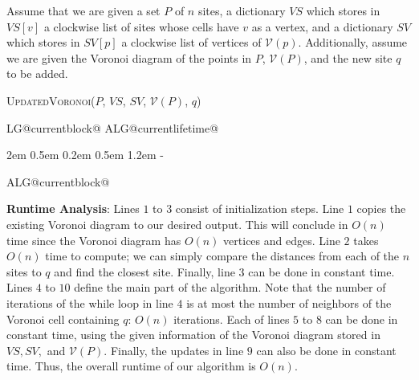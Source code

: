 \documentclass[11pt]{article}
\makeatletter
\newlength{\continueindent}
\renewenvironment{algorithmic}[1][0]%
   {%
   \edef\ALG@numberfreq{#1}%
   \def\@currentlabel{\theALG@line}%
   \setcounter{ALG@line}{0}%
   \setcounter{ALG@rem}{0}%
   \let\\\algbreak%
   \expandafter\edef\csname ALG@currentblock@\theALG@nested\endcsname{0}%
   \expandafter\let\csname ALG@currentlifetime@\theALG@nested\endcsname\relax%
   \begin{list}%
      {\ALG@step}%
      {%
      \rightmargin\z@%
      \itemsep\z@ \itemindent\z@ \listparindent2em%
      \partopsep\z@ \parskip\z@ \parsep\z@%
      \labelsep 0.5em \topsep 0.2em%
      \ifthenelse{\equal{#1}{0}}%
         {\labelwidth 0.5em}%
         {\labelwidth 1.2em}%
       \leftmargin\labelwidth \addtolength{\leftmargin}{\labelsep}
      \ALG@tlm\z@%
      }%
      \parshape 2 \leftmargin \linewidth \continueindent \dimexpr\linewidth-\continueindent\relax
   \setcounter{ALG@nested}{0}%
   \ALG@beginalgorithmic%
   }%
   {%
   \ALG@closeloops%
   \expandafter\ifnum\csname ALG@currentblock@\theALG@nested\endcsname=0\relax%
   \else%
      \PackageError{algorithmicx}{Some blocks are not closed!!!}{}%
   \fi%
   \ALG@endalgorithmic%
   \end{list}%
   }%
\makeatother
\begin{document}
\begin{enumerate}
Assume that we are given a set $P$ of $n$ sites, a dictionary $VS$ which stores in $VS[v]$ a clockwise list of sites whose cells have $v$ as a vertex, and a dictionary $SV$ which stores in $SV[p]$ a clockwise list of vertices of $\mathcal{V}(p)$. Additionally, assume we are given the Voronoi diagram of the points in $P$, $\mathcal{V}(P)$, and the new site $q$ to be added.

\begin{minipage}[t]{0.9\textwidth}
    \begin{algorithm}[H]
    \caption{\textsc{UpdatedVoronoi}($P$, $VS$, $SV$, $\mathcal{V}(P)$, $q$)}
    \begin{algorithmic}[1]
        \EndWhile
        
    \end{algorithmic}
    \end{algorithm}
\end{minipage}

\vspace{1em}

\textbf{Runtime Analysis}: 
Lines $1$ to $3$ consist of initialization steps. Line $1$ copies the existing Voronoi diagram to our desired output. This will conclude in $O(n)$ time since the Voronoi diagram has $O(n)$ vertices and edges. Line $2$ takes $O(n)$ time to compute; we can simply compare the distances from each of the $n$ sites to $q$ and find the closest site. Finally, line $3$ can be done in constant time. \\

Lines $4$ to $10$ define the main part of the algorithm. Note that the number of iterations of the while loop in line $4$ is at most the number of neighbors of the Voronoi cell containing $q$: $O(n)$ iterations. Each of lines $5$ to $8$ can be done in constant time, using the given information of the Voronoi diagram stored in $VS, SV,$ and $\mathcal{V}(P).$ Finally, the updates in line $9$ can also be done in constant time. Thus, the overall runtime of our algorithm is $O(n)$. \\


\end{enumerate}
\end{document}
